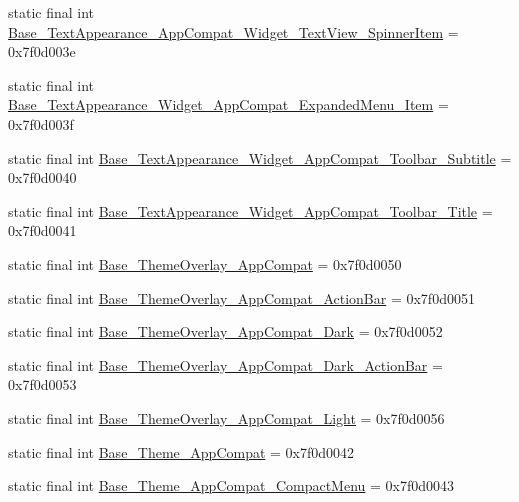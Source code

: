 \begin{DoxyCompactItemize}
\item 
static final int \mbox{\hyperlink{classcom_1_1google_1_1android_1_1gms_1_1R_1_1style_a16b867805e95675bf8125eef89ad8156}{Base\+\_\+\+Text\+Appearance\+\_\+\+App\+Compat\+\_\+\+Widget\+\_\+\+Text\+View\+\_\+\+Spinner\+Item}} = 0x7f0d003e
\item 
static final int \mbox{\hyperlink{classcom_1_1google_1_1android_1_1gms_1_1R_1_1style_adff3f3c538ecc5ac168cf16f93ac2415}{Base\+\_\+\+Text\+Appearance\+\_\+\+Widget\+\_\+\+App\+Compat\+\_\+\+Expanded\+Menu\+\_\+\+Item}} = 0x7f0d003f
\item 
static final int \mbox{\hyperlink{classcom_1_1google_1_1android_1_1gms_1_1R_1_1style_abfc12daa17962d24797ba22ba18d576d}{Base\+\_\+\+Text\+Appearance\+\_\+\+Widget\+\_\+\+App\+Compat\+\_\+\+Toolbar\+\_\+\+Subtitle}} = 0x7f0d0040
\item 
static final int \mbox{\hyperlink{classcom_1_1google_1_1android_1_1gms_1_1R_1_1style_a8ca513ba54c0c0246193020245495e4f}{Base\+\_\+\+Text\+Appearance\+\_\+\+Widget\+\_\+\+App\+Compat\+\_\+\+Toolbar\+\_\+\+Title}} = 0x7f0d0041
\item 
static final int \mbox{\hyperlink{classcom_1_1google_1_1android_1_1gms_1_1R_1_1style_a9b3f3c2bb5f7d4d6d6f93a6bd05d9a79}{Base\+\_\+\+Theme\+Overlay\+\_\+\+App\+Compat}} = 0x7f0d0050
\item 
static final int \mbox{\hyperlink{classcom_1_1google_1_1android_1_1gms_1_1R_1_1style_a7390067b586d5a5f01beb8cee27b5e19}{Base\+\_\+\+Theme\+Overlay\+\_\+\+App\+Compat\+\_\+\+Action\+Bar}} = 0x7f0d0051
\item 
static final int \mbox{\hyperlink{classcom_1_1google_1_1android_1_1gms_1_1R_1_1style_a8780ed722d8b55f748678b185db47c03}{Base\+\_\+\+Theme\+Overlay\+\_\+\+App\+Compat\+\_\+\+Dark}} = 0x7f0d0052
\item 
static final int \mbox{\hyperlink{classcom_1_1google_1_1android_1_1gms_1_1R_1_1style_a7e195d55a52c3e77b421bccfd5af9c66}{Base\+\_\+\+Theme\+Overlay\+\_\+\+App\+Compat\+\_\+\+Dark\+\_\+\+Action\+Bar}} = 0x7f0d0053
\item 
static final int \mbox{\hyperlink{classcom_1_1google_1_1android_1_1gms_1_1R_1_1style_af4b01155543b745c1c59e99b7dc22363}{Base\+\_\+\+Theme\+Overlay\+\_\+\+App\+Compat\+\_\+\+Light}} = 0x7f0d0056
\item 
static final int \mbox{\hyperlink{classcom_1_1google_1_1android_1_1gms_1_1R_1_1style_aafed7da1a8003923aa3512c739ec4fc2}{Base\+\_\+\+Theme\+\_\+\+App\+Compat}} = 0x7f0d0042
\item 
static final int \mbox{\hyperlink{classcom_1_1google_1_1android_1_1gms_1_1R_1_1style_a89b26a1d73764c63d88997e928f6bd52}{Base\+\_\+\+Theme\+\_\+\+App\+Compat\+\_\+\+Compact\+Menu}} = 0x7f0d0043

\end{DoxyCompactItemize}
